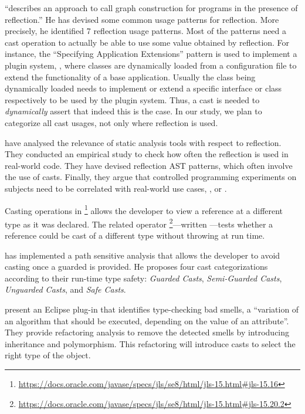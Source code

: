\cite{livshitsImprovingSoftwareSecurity2006,livshitsReflectionAnalysisJava2005} ``describes an approach to call graph construction for \java{} programs in the presence of reflection.''
He has devised some common usage patterns for reflection.
More precisely, he identified 7 reflection usage patterns.
Most of the patterns need a cast operation to actually be able to use some value obtained by reflection.
For instance,
the ``Specifying Application Extensions'' pattern is used to implement a plugin system,
\ie, where classes are dynamically loaded from a configuration file to extend the functionality of a base application.
Usually the class being dynamically loaded needs to implement or extend a specific interface or class respectively to be used by the plugin system.
Thus, a cast is needed to \emph{dynamically} assert that indeed this is the case.
In our study, we plan to categorize all cast usages, not only where reflection is used.

\cite{landmanChallengesStaticAnalysis2017} have analysed the relevance of
static analysis tools with respect to reflection.
They conducted an empirical study to check how often the reflection
\api{} is used in real-world code.
They have devised reflection AST patterns,
which often involve the use of casts.
Finally, they argue that controlled programming experiments on
subjects need to be correlated with real-world use cases,
\eg, \github{} or \mavencentral{}.

Casting operations in \java{}%
\footnote{\url{https://docs.oracle.com/javase/specs/jls/se8/html/jls-15.html\#jls-15.16}}
allows the developer to view a reference at a different type as it was declared.
The related  operator%
\footnote{\url{https://docs.oracle.com/javase/specs/jls/se8/html/jls-15.html\#jls-15.20.2}}---written ---tests whether a reference  could be cast of a different type  without
throwing  at run time.

\cite{wintherGuardedTypePromotion2011} has implemented a
path sensitive analysis that allows the developer to avoid casting
once a guarded  is provided.
He proposes four cast categorizations according to their
run-time type safety:
\emph{Guarded Casts}, \emph{Semi-Guarded Casts},
\emph{Unguarded Casts}, and \emph{Safe Casts}.

\cite{tsantalisJDeodorantIdentificationRemoval2008} present an
Eclipse plug-in that identifies type-checking bad smells,
a ``variation of an algorithm that should be executed,
depending on the value of an attribute''.
They provide refactoring analysis to remove the detected smells
by introducing inheritance and polymorphism.
This refactoring will introduce casts to select
the right type of the object.

